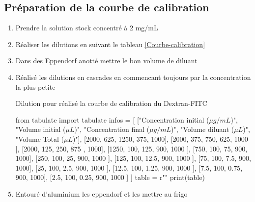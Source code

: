 \subsection{Préparation de la courbe de calibration}

\begin{enumerate}
\item Prendre la solution stock concentré à 2 mg/mL
\item Réaliser les dilutions en suivant le tableau \ref{Courbe-calibration}
\item Dans des Eppendorf anotté mettre le bon volume de diluant
\item Réalisé les dilutions en cascades en commencant toujours par la concentration la plus petite
\begin{table}[H]
\caption{Dilution pour réalisé la courbe de calibration du Dextran-FITC}
\label{Courbe-calibration}
\begin{pycode}

from tabulate import tabulate
infos = [
    ["Concentration initial ($\mu g/mL$)", "Volume initial ($\mu L$)", "Concentration final ($\mu g/mL$)", "Volume diluant ($\mu L$)",  "Volume Total ($\mu L$)"],
    [2000, 625, 1250, 375, 1000],
    [2000, 375, 750, 625, 1000 ],
    [2000, 125, 250, 875 , 1000],
    [1250, 100, 125, 900, 1000 ],
    [750, 100, 75, 900, 1000],
    [250, 100, 25, 900, 1000 ],
    [125, 100, 12.5, 900, 1000 ],
    [75, 100, 7.5, 900, 1000],
    [25, 100, 2.5, 900, 1000 ],
    [12.5, 100, 1.25, 900, 1000 ],
    [7.5, 100, 0.75, 900, 1000],
    [2.5, 100, 0.25, 900, 1000 ]
]
table = r""
print(table)
\end{pycode}
\label{table-ensemencement}
\end{table}

\item Entouré d'aluminium les eppendorf et les mettre au frigo
\end{enumerate}